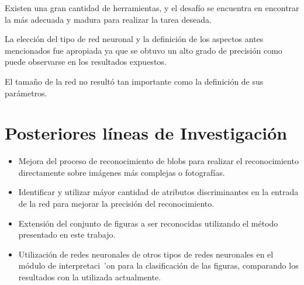 \documentclass[pdftex,a4paper,10.5pt]{article}
\begin{document}
	Existen una gran cantidad de herramientas, y el desaf\'io se encuentra en encontrar
	la m\'as adecuada y madura para realizar la tarea deseada.

	La elecci\'on del tipo de red neuronal y la definici\'on de los aspectos antes mencionados
	fue apropiada ya que se obtuvo un alto grado de precisi\'on como puede observarse
	en los resultados expuestos.
	
	El tama\~no de la red no result\'o tan importante como la definici\'on de sus par\'ametros.

\section{Posteriores l\'ineas de Investigaci\'on} %

\begin{itemize}
\item 	Mejora del proceso de reconocimiento de blobs para realizar el reconocimiento directamente sobre im\'agenes m\'as complejas o fotograf\'ias.
\item 	Identificar y utilizar m\'ayor cantidad de atributos discriminantes en la entrada de la red para mejorar la precisi\'on del reconocimiento.
\item 	Extensi\'on del conjunto de figuras a ser reconocidas utilizando el m\'etodo presentado en este trabajo.
\item 	Utilizaci\'on de redes neuronales de otros tipos de redes neuronales en el m\'odulo de interpretaci\ 'on para la clasificaci\'on de las figuras, comparando los resultados con la utilizada actualmente.

\end{itemize}
\newpage
\end{document}
